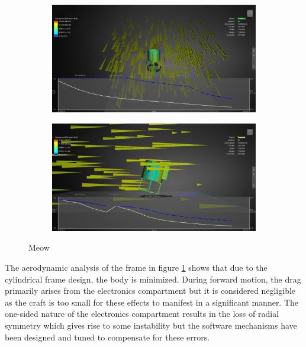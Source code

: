 \documentclass[12pt]{article}
\begin{document}
\begin{figure}
	\centering
	\begin{subfigure}{0.5\textwidth}
		\centering
		\includegraphics[width=0.9\linewidth]{aerodynamic-1.png}
	\end{subfigure}%
	\begin{subfigure}{0.5\textwidth}
		\centering
		\includegraphics[width=0.9\linewidth]{aerodynamic-2.png}
	\end{subfigure}
	\caption{Meow}
	\label{fig:aerodynamic}
\end{figure}

The aerodynamic analysis of the frame in figure \ref{fig:aerodynamic} shows that due to the cylindrical frame design, the body is minimized. During forward motion, the drag primarily arises from the electronics compartment but it is considered negligible as the craft is too small for these effects to manifest in a significant manner. The one-sided nature of the electronics compartment results in the loss of radial symmetry which gives rise to some instability but the software mechanisms have been designed and tuned to compensate for these errors.
\end{document}
